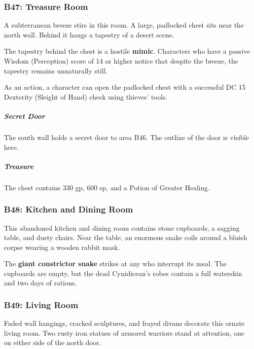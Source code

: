 \documentclass[10pt,a4paper,twoside,bg=print,twocolumn,openany,nodeprecatedcode]{dndbook}
\begin{document}
\subsubsection{B47: Treasure Room}
\begin{DndReadAloud}{}
A subterranean breeze stirs in this room. A large, padlocked chest sits near the north wall. Behind it hangs a tapestry of a desert scene.

\end{DndReadAloud}

The tapestry behind the chest is a hostile \textbf{mimic}. Characters who have a passive Wisdom (Perception) score of 14 or higher notice that despite the breeze, the tapestry remains unnaturally still.

As an action, a character can open the padlocked chest with a successful DC 15 Dexterity (Sleight of Hand) check using thieves' tools.

\subparagraph{Secret Door}
The south wall holds a secret door to area B46. The outline of the door is visible here.

\subparagraph{Treasure}
The chest contains 330 gp, 600 sp, and a Potion of Greater Healing.

\subsubsection{B48: Kitchen and Dining Room}
\begin{DndReadAloud}{}
This abandoned kitchen and dining room contains stone cupboards, a sagging table, and dusty chairs. Near the table, an enormous snake coils around a bluish corpse wearing a wooden rabbit mask.

\end{DndReadAloud}

The \textbf{giant constrictor snake} strikes at any who interrupt its meal. The cupboards are empty, but the dead Cynidicean's robes contain a full waterskin and two days of rations.

\subsubsection{B49: Living Room}
\begin{DndReadAloud}{}
Faded wall hangings, cracked sculptures, and frayed divans decorate this ornate living room. Two rusty iron statues of armored warriors stand at attention, one on either side of the north door.

\end{DndReadAloud}
\end{document}
